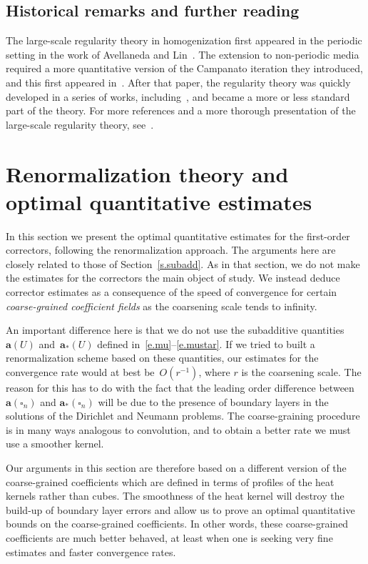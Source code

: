 \documentclass[11pt]{article} %
\let\oldsquare\square %
\renewcommand{\square}{\oldsquare}
\numberwithin{equation}{section}
\theoremstyle{definition}
\renewcommand{\a}{\mathbf{a}}
\newcommand{\cu}{\square}
\begin{document}
\subsection*{Historical remarks and further reading}

The large-scale regularity theory in homogenization first appeared in the periodic setting in the work of Avellaneda and Lin~\cite{AL1,AL2,AL3}. The extension to non-periodic media required a more quantitative version of the Campanato iteration they introduced, and this first appeared in~\cite{AS}. After that paper, the regularity theory was quickly developed in a series of works, including~\cite{GNO3,FO,AKM1,AKM,AKMBook}, and became a more or less standard part of the theory. For more references and a more thorough presentation of the large-scale regularity theory, see~\cite[Chapter 3]{AKMBook}. 



\section{Renormalization theory and optimal quantitative estimates}
\label{s.renormalization}

In this section we present the optimal quantitative estimates for the first-order correctors, following the renormalization approach. The arguments here are closely related to those of Section~\ref{s.subadd}. As in that section, we do not make the estimates for the correctors the main object of study. We instead deduce corrector estimates as a consequence of the speed of convergence for certain \emph{coarse-grained coefficient fields} as the coarsening scale tends to infinity. 

An important difference here is that we do not use the subadditive quantities~$\a(U)$ and~$\a_*(U)$ defined in~\eqref{e.mu}--\eqref{e.mustar}. If we tried to built a renormalization scheme based on these quantities, our estimates for the convergence rate would at best be~$O(r^{-1})$, where $r$ is the coarsening scale. The reason for this has to do with the fact that the leading order difference between~$\a(\cu_n)$ and $\a_*(\cu_n)$ will be due to the presence of boundary layers in the solutions of the Dirichlet and Neumann problems. 
The coarse-graining procedure is in many ways analogous to convolution, and to obtain a better rate we must use a smoother kernel.

Our arguments in this section are therefore based on a different version of the coarse-grained coefficients which are defined in terms of profiles of the heat kernels rather than cubes. 
The smoothness of the heat kernel will destroy the build-up of boundary layer errors and allow us to prove an optimal quantitative bounds on the coarse-grained coefficients. In other words, these coarse-grained coefficients are much better behaved, at least when one is seeking very fine estimates and faster convergence rates. 
\end{document}
